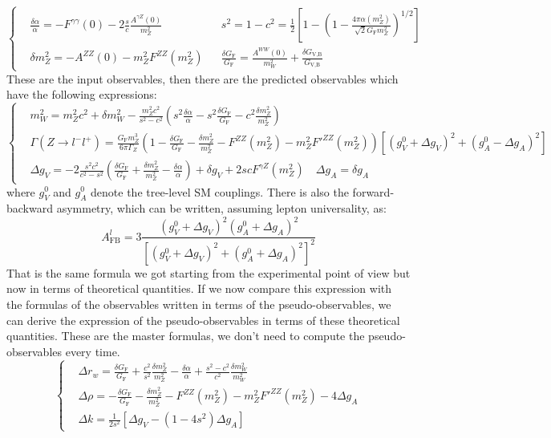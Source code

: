 \documentclass[../main.tex]{subfiles}
\begin{document}
\[
\left\{
\begin{aligned}
&\frac{\delta\alpha}{\alpha}=-F^{\gamma\gamma}(0)-2\frac{s}{c}\frac{A^{\gamma Z}(0)}{m_Z^2} &&s^2=1-c^2=\frac{1}{2}\left[1-\left(1-\frac{4\pi\alpha(m_Z^2)}{\sqrt{2}G_{\text{F}}m_Z^2}\right)^{1/2}\right]\\
&\delta m_Z^2=-A^{ZZ}(0)-m_Z^2F^{ZZ}(m_Z^2) &&\frac{\delta G_{\text{F}}}{G_{\text{F}}}=\frac{A^{WW}(0)}{m_W^2}+\frac{\delta G_{\text{V,B}}}{G_{\text{V,B}}}
\end{aligned}
\right.
\]
These are the input observables, then there are the predicted observables which have the following expressions:
\[
\left\{
\begin{aligned}
&m_W^2=m_Z^2c^2+\delta m_W^2-\frac{m_Z^2c^2}{s^2-c^2} \left(s^2\frac{\delta\alpha}{\alpha}-s^2\frac{\delta G_{\text{F}}}{G_{\text{F}}}-c^2\frac{\delta m_Z^2}{m_Z^2}\right)\\
&\Gamma(Z\to l^-l^+)=\frac{G_{\text{F}}m_Z^3}{6\pi\Gamma_Z}\left(1-\frac{\delta G_{\text{F}}}{G_{\text{F}}}-\frac{\delta m_Z^2}{m_Z^2}-F^{ZZ}(m_Z^2)-m_Z^2F'^{ZZ}(m_Z^2)\right)\left[(g_V^0+\Delta g_V)^2+(g_A^0-\Delta g_A)^2\right]\\
&\Delta g_V=-2\frac{s^2c^2}{c^2-s^2}\left(\frac{\delta G_{\text{F}}}{G_{\text{F}}}+\frac{\delta m_Z^2}{m_Z^2}-\frac{\delta\alpha}{\alpha}\right)+\delta g_V+2scF^{\gamma Z}(m_Z^2) \quad \Delta g_A=\delta g_A
\end{aligned}
\right.
\]
where $g_V^0$ and $g_A^0$ denote the tree-level SM couplings. There is also the forward-backward asymmetry, which can be written, assuming lepton universality, as:
\[
A_{\text{FB}}^l=3\frac{(g_V^0+\Delta g_V)^2(g_A^0+\Delta g_A)^2}{\left[(g_V^0+\Delta g_V)^2+(g_A^0+\Delta g_A)^2\right]^2}
\]
That is the same formula we got starting from the experimental point of view but now in terms of theoretical quantities. If we now compare this expression with the formulas of the observables written in terms of the pseudo-observables, we can derive the expression of the pseudo-observables in terms of these theoretical quantities. These are the master formulas, we don't need to compute the pseudo-observables every time. 
\[
\left\{
\begin{aligned}
&\Delta r_w=\frac{\delta G_{\text{F}}}{G_{\text{F}}}+\frac{c^2}{s^2}\frac{\delta m_Z^2}{m_Z^2}-\frac{\delta\alpha}{\alpha}+\frac{s^2-c^2}{c^2}\frac{\delta m_W^2}{m_W^2}\\
&\Delta\rho=-\frac{\delta G_{\text{F}}}{G_{\text{F}}}-\frac{\delta m_Z^2}{m_Z^2}-F^{ZZ}(m_Z^2)-m_Z^2F'^{ZZ}(m_Z^2)-4\Delta g_A\\
&\Delta k=\frac{1}{2s^2}[\Delta g_V-(1-4s^2)\Delta g_A]
\end{aligned}
\right.
\]
\end{document}
